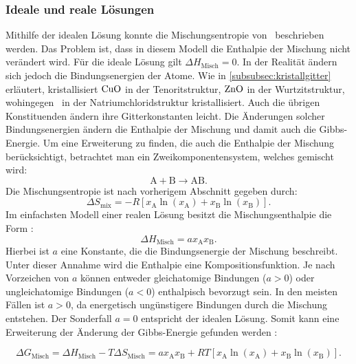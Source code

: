 \subsubsection{Ideale und reale Lösungen}
Mithilfe der idealen Lösung konnte die Mischungsentropie von \heo\ beschrieben werden.
Das Problem ist, dass in diesem Modell die Enthalpie der Mischung nicht verändert wird.
Für die ideale Lösung gilt $\Delta H_\mathrm{Misch} = 0$.
In der Realität ändern sich jedoch die Bindungsenergien der Atome.
Wie in \cref{subsubsec:kristallgitter} erläutert, kristallisiert $\ce{CuO}$ in der Tenoritstruktur, $\ce{ZnO}$ in der
Wurtzitstruktur, wohingegen \heo\ in der Natriumchloridstruktur kristallisiert.
Auch die übrigen Konstituenden ändern ihre Gitterkonstanten leicht.
Die Änderungen solcher Bindungsenergien ändern die Enthalpie der Mischung und damit auch die Gibbs-Energie.
Um eine Erweiterung zu finden, die auch die Enthalpie der Mischung berücksichtigt, betrachtet man ein
Zweikomponentensystem, welches gemischt wird:
\begin{equation}
    \mathrm{A} + \mathrm{B} \longrightarrow \mathrm{AB}.
    \label{eq:reaktion}
\end{equation}
Die Mischungsentropie ist nach vorherigem Abschnitt gegeben durch:
\begin{equation}
    \Delta S_{\mathrm{mix}}=-R[x_{\mathrm{A}}\ln(x_{\mathrm{A}})+x_{\mathrm{B}}\ln(x_{\mathrm{B}})].
    \label{eq:Mischungsentropie3}
\end{equation}
Im einfachsten Modell einer realen Lösung besitzt die Mischungsenthalpie die Form \autocite{rost_phd}:
\begin{equation}
    \Delta H_{\mathrm{Misch}}= a x_{\mathrm{A}} x_{\mathrm{B}}.
    \label{eq:Mischungsenthalpie}
\end{equation}
Hierbei ist $a$ eine Konstante, die die Bindungsenergie der Mischung beschreibt.
Unter dieser Annahme wird die Enthalpie eine Kompositionsfunktion.
Je nach Vorzeichen von $a$ können entweder gleichatomige Bindungen ($a > 0$) oder ungleichatomige Bindungen
($a < 0$) enthalpisch bevorzugt sein.
In den meisten Fällen ist $a > 0$, da energetisch ungünstigere Bindungen durch die Mischung entstehen.
Der Sonderfall $a=0$ entspricht der idealen Lösung.
Somit kann eine Erweiterung der Änderung der Gibbs-Energie gefunden werden \autocite{rost_phd}:

\begin{equation}
    \Delta G_{\mathrm{Misch}}=\Delta H_{\mathrm{Misch}}-T\Delta S_{\mathrm{Misch}}=a x_{\mathrm{A}} x_{\mathrm{B}}
    +RT[x_{\mathrm{A}}\ln(x_{\mathrm{A}})+x_{\mathrm{B}}\ln(x_{\mathrm{B}})].
    \label{eq:mischgibbs}
\end{equation}

